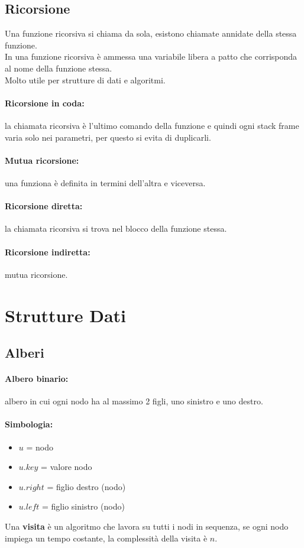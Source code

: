 \documentclass[a4paper,12pt]{article}
\let\oldsection\section
\renewcommand{\section}{\clearpage\oldsection}
\begin{document}
\subsection{Ricorsione}
Una funzione ricorsiva si chiama da sola, esistono chiamate annidate della stessa funzione.\\
In una funzione ricorsiva è ammessa una variabile libera a patto che corrisponda al nome della funzione stessa.\\
Molto utile per strutture di dati e algoritmi.
\paragraph{Ricorsione in coda: } la chiamata ricorsiva è l'ultimo comando della funzione e quindi ogni stack frame varia solo nei parametri, per questo si evita di duplicarli.
\paragraph{Mutua ricorsione: } una funziona è definita in termini dell'altra e viceversa.
\paragraph{Ricorsione diretta: } la chiamata ricorsiva si trova nel blocco della funzione stessa.
\paragraph{Ricorsione indiretta: } mutua ricorsione.

\section{Strutture Dati}
\subsection{Alberi}
\paragraph{Albero binario:} albero in cui ogni nodo ha al massimo 2 figli, uno sinistro e uno destro.
\paragraph{Simbologia:}
\begin{itemize}
  \item $u$ = nodo
  \item $u.key$ = valore nodo
  \item $u.right$ = figlio destro (nodo)
  \item $u.left$ = figlio sinistro (nodo)
\end{itemize}
Una \textbf{visita} è un algoritmo che lavora su tutti i nodi in sequenza, se ogni nodo impiega un tempo costante, la complessità della visita è $n$.
\end{document}
